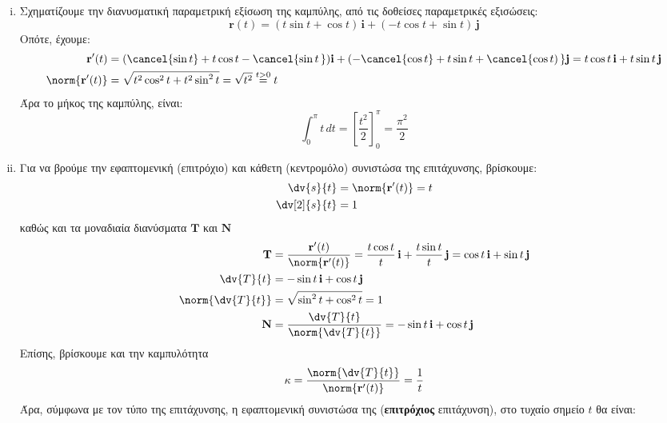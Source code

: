 \documentclass[a4paper,table]{report}
\begin{document}
\begin{solution}
\item {}
  \begin{enumerate}[i)]
    \item Σχηματίζουμε την διανυσματική παραμετρική εξίσωση της καμπύλης, από τις 
      δοθείσες παραμετρικές εξισώσεις:
      \[
        \mathbf{r}(t) = (t \sin{t} + \cos{t}) \, \mathbf{i} + (-t \cos{t} + \sin{t} )
        \, \mathbf{j} 
      \] 
      Οπότε, έχουμε:
      \begin{align*}
        \mathbf{r'}(t) &= (\cancel{\sin{t}} + t \cos{t} - \cancel{\sin{t}\,}) 
        \mathbf{i} + (- \cancel{\cos{t}} + t \sin{t} + \cancel{\cos{t})\,} \mathbf{j} = 
        t \cos{t} \, \mathbf{i} + t \sin{t} \, \mathbf{j} \\
        \norm{\mathbf{r'}(t)} &= \sqrt{t^2 \cos^{2}{t} + t^2 \sin^{2}{t}} = \sqrt{t^2}
        \overset{t>0}{=} t
      \end{align*} 
      Άρα το μήκος της καμπύλης, είναι:
      \[
        \int _{0}^{ \pi} t \,{dt} = \left[ \frac{t^2}{2} \right]_{0}^{\pi} = \frac{\pi
        ^{2}}{2}
      \]
    \item Για να βρούμε την εφαπτομενική (επιτρόχιο) και κάθετη (κεντρομόλο) συνιστώσα 
      της επιτάχυνσης, βρίσκουμε:
      \begin{align*}
        \dv{s}{t} &= \norm{\mathbf{r'}(t)} = t \\
        \dv[2]{s}{t} &= 1
      \end{align*}
      καθώς και τα μοναδιαία διανύσματα $ \mathbf{T} $ και $ \mathbf{N} $
      \begin{align*}
        \mathbf{T} &= \frac{\mathbf{r'}(t)}{\norm{\mathbf{r'}(t)}} = \frac{t \cos{t}}{t} \,
        \mathbf{i} + \frac{t \sin{t}}{t} \, \mathbf{j} = \cos{t} \, \mathbf{i} +
        \sin{t} \, \mathbf{j} \\
        \dv{T}{t} &= - \sin{t} \, \mathbf{i} + \cos{t} \, \mathbf{j} \\
        \norm{\dv{T}{t}} &= \sqrt{\sin^{2}{t} + \cos^{2}{t}} = 1 \\
        \mathbf{N} &= \frac{\dv{T}{t}}{\norm{\dv{T}{t}}} = - \sin{t} \, \mathbf{i} + \cos{t}
        \, \mathbf{j} 
      \end{align*}
      Επίσης, βρίσκουμε και την καμπυλότητα
      \[
        \kappa = \frac{\norm{\dv{T}{t}}}{\norm{\mathbf{r'}(t)}} = \frac{1}{t} 
      \] 
      Άρα, σύμφωνα με τον τύπο της επιτάχυνσης, η εφαπτομενική συνιστώσα της
      (\textbf{επιτρόχιος} επιτάχυνση), στο τυχαίο σημείο $t$ θα είναι:

\end{enumerate}
\end{solution}
\end{document}
